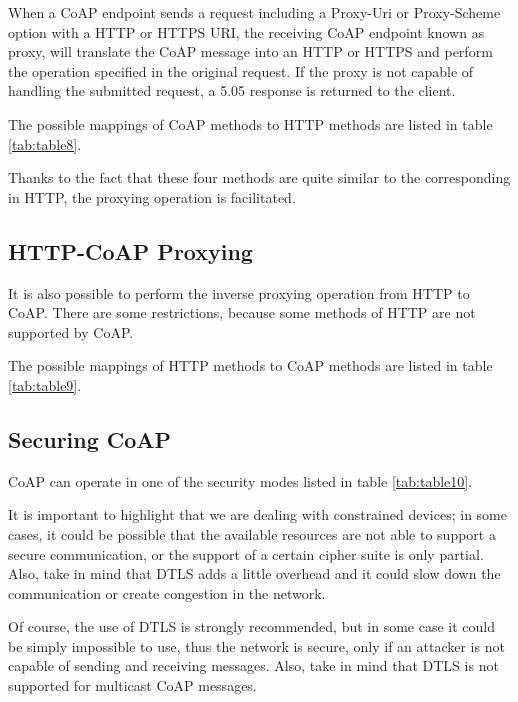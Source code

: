 	When a CoAP endpoint sends a request including a Proxy-Uri or Proxy-Scheme option with a HTTP or HTTPS URI, the receiving CoAP endpoint known as proxy, will translate the CoAP message into an HTTP or HTTPS and perform the operation specified in the original request.\newline
	If the proxy is not capable of handling the submitted request, a 5.05 response is returned to the client.\newline
	
	
	
	The possible mappings of CoAP methods to HTTP methods are listed in table \ref{tab:table8}.
	
	Thanks to the fact that these four methods are quite similar to the corresponding in HTTP, the proxying operation is facilitated.\newline
	
	\subsection{HTTP-CoAP Proxying}
	It is also possible to perform the inverse proxying operation from HTTP to CoAP.\newline
	There are some restrictions, because some methods of HTTP are not supported by CoAP.
	
	The possible mappings of HTTP methods to CoAP methods are listed in table \ref{tab:table9}.
	
	
	
	\subsection{Securing CoAP}
	CoAP can operate in one of the security modes listed in table \ref{tab:table10}.
	
	
	
	It is important to highlight that we are dealing with constrained devices; in some cases, it could be possible that the available resources are not able to support a secure communication, or the support of a certain cipher suite is only partial.\newline
	Also, take in mind that DTLS adds a little overhead and it could slow down the communication or create congestion in the network.\newline
	
	Of course, the use of DTLS is strongly recommended, but in some case it could be simply impossible to use, thus the network is secure, only if an attacker is not capable of sending and receiving messages.\newline
	Also, take in mind that DTLS is not supported for multicast CoAP messages.\newline
	
